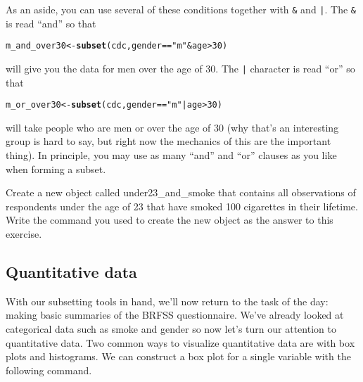 \documentclass{article}\usepackage[]{graphicx}\usepackage[]{color}
\makeatletter
\newcommand{\hlnum}[1]{\textcolor[rgb]{0.686,0.059,0.569}{#1}}%
\newcommand{\hlstr}[1]{\textcolor[rgb]{0.192,0.494,0.8}{#1}}%
\newcommand{\hlopt}[1]{\textcolor[rgb]{0,0,0}{#1}}%
\newcommand{\hlstd}[1]{\textcolor[rgb]{0.345,0.345,0.345}{#1}}%
\newcommand{\hlkwb}[1]{\textcolor[rgb]{0.69,0.353,0.396}{#1}}%
\newcommand{\hlkwd}[1]{\textcolor[rgb]{0.737,0.353,0.396}{\textbf{#1}}}%
\newenvironment{kframe}{%
 \def\at@end@of@kframe{}%
 \ifinner\ifhmode%
  \def\at@end@of@kframe{\end{minipage}}%
  \begin{minipage}{\columnwidth}%
 \fi\fi%
 \def\FrameCommand##1{\hskip\@totalleftmargin \hskip-\fboxsep
 \colorbox{shadecolor}{##1}\hskip-\fboxsep
     \hskip-\linewidth \hskip-\@totalleftmargin \hskip\columnwidth}%
 \MakeFramed {\advance\hsize-\width
   \@totalleftmargin\z@ \linewidth\hsize
   \@setminipage}}%
 {\par\unskip\endMakeFramed%
 \at@end@of@kframe}
\newenvironment{knitrout}{}{} %
\makeatother
\begin{document}
As an aside, you can use several of these conditions together with \texttt{\&} and \texttt{|}. The \texttt{\&} is read ``and'' so that

\begin{knitrout}
\color{fgcolor}\begin{kframe}
\begin{alltt}
\hlstd{m_and_over30} \hlkwb{<-} \hlkwd{subset}\hlstd{(cdc, gender} \hlopt{==} \hlstr{"m"} \hlopt{&} \hlstd{age} \hlopt{>} \hlnum{30}\hlstd{)}
\end{alltt}
\end{kframe}
\end{knitrout}


will give you the data for men over the age of 30. The \texttt{|} character is read ``or'' so that

\begin{knitrout}
\color{fgcolor}\begin{kframe}
\begin{alltt}
\hlstd{m_or_over30} \hlkwb{<-} \hlkwd{subset}\hlstd{(cdc, gender} \hlopt{==} \hlstr{"m"} \hlopt{|} \hlstd{age} \hlopt{>} \hlnum{30}\hlstd{)}
\end{alltt}
\end{kframe}
\end{knitrout}


will take people who are men or over the age of 30 (why that's an interesting group is hard to say, but right now the mechanics of this are the important thing). In principle, you may use as many ``and'' and ``or'' clauses as you like when forming a subset.

\begin{exercise}
Create a new object called \hlstd{under23\_and\_smoke} that contains all observations of respondents under the age of 23 that have smoked 100 cigarettes in their lifetime. Write the command you used to create the new object as the answer to this exercise.
\end{exercise}

\subsection*{Quantitative data}

With our subsetting tools in hand, we'll now return to the task of the day: making basic summaries of the BRFSS questionnaire.  We've already looked at categorical data such as \hlstd{smoke} and \hlstd{gender} so now let's turn our attention to quantitative data.  Two common ways to visualize quantitative data are with box plots and histograms.  We can construct a box plot for a single variable with the following command.
\end{document}
